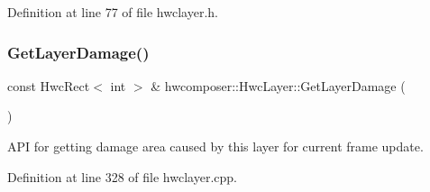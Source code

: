 Definition at line 77 of file hwclayer.\+h.


\begin{DoxyCode}{0}
\end{DoxyCode}
\mbox{\label{structhwcomposer_1_1HwcLayer_a223024192844b0dec2cbfa695874b8d8}} 
\subsubsection{\texorpdfstring{Get\+Layer\+Damage()}{GetLayerDamage()}}
{\footnotesize\ttfamily const Hwc\+Rect$<$ int $>$ \& hwcomposer\+::\+Hwc\+Layer\+::\+Get\+Layer\+Damage (\begin{DoxyParamCaption}{ }\end{DoxyParamCaption})}

A\+PI for getting damage area caused by this layer for current frame update. 

Definition at line 328 of file hwclayer.\+cpp.


